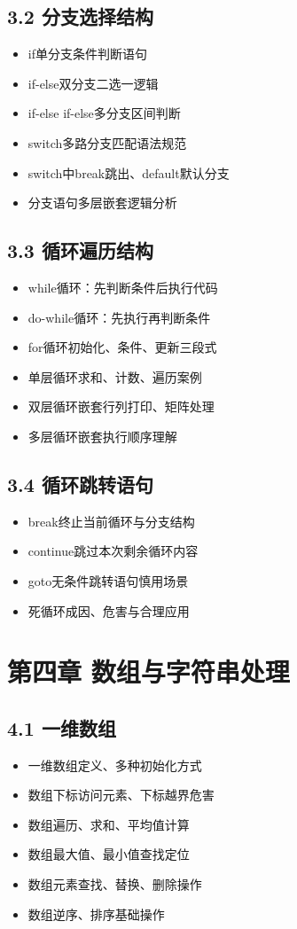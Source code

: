 \subsection{3.2 分支选择结构}
\begin{itemize}
\item if单分支条件判断语句
\item if-else双分支二选一逻辑
\item if-else if-else多分支区间判断
\item switch多路分支匹配语法规范
\item switch中break跳出、default默认分支
\item 分支语句多层嵌套逻辑分析
\end{itemize}

\subsection{3.3 循环遍历结构}
\begin{itemize}
\item while循环：先判断条件后执行代码
\item do-while循环：先执行再判断条件
\item for循环初始化、条件、更新三段式
\item 单层循环求和、计数、遍历案例
\item 双层循环嵌套行列打印、矩阵处理
\item 多层循环嵌套执行顺序理解
\end{itemize}

\subsection{3.4 循环跳转语句}
\begin{itemize}
\item break终止当前循环与分支结构
\item continue跳过本次剩余循环内容
\item goto无条件跳转语句慎用场景
\item 死循环成因、危害与合理应用
\end{itemize}

\section{第四章 数组与字符串处理}
\subsection{4.1 一维数组}
\begin{itemize}
\item 一维数组定义、多种初始化方式
\item 数组下标访问元素、下标越界危害
\item 数组遍历、求和、平均值计算
\item 数组最大值、最小值查找定位
\item 数组元素查找、替换、删除操作
\item 数组逆序、排序基础操作
\end{itemize}

